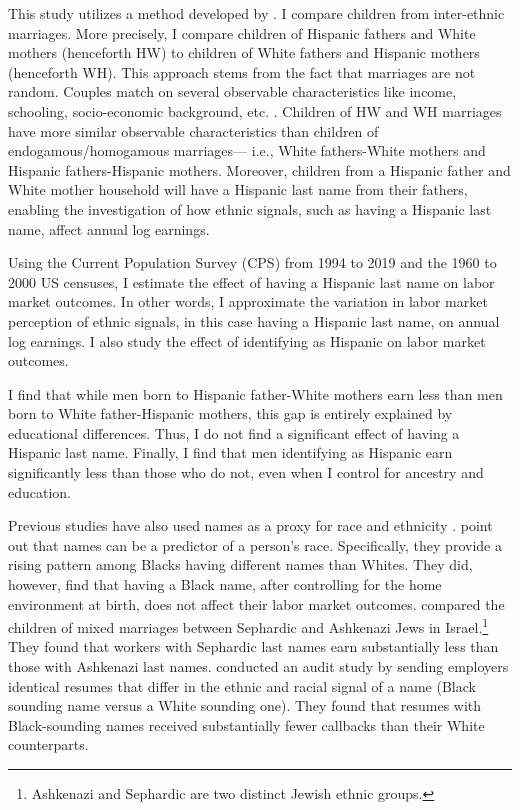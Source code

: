 \documentclass[a4paper,fleqn]{cas-sc}
\begin{document}
This study utilizes a method developed by \citet{rubinstein2014pride}. I compare children from inter-ethnic marriages. More precisely, I compare children of Hispanic fathers and White mothers (henceforth HW) to children of White fathers and Hispanic mothers (henceforth  WH). This approach stems from the fact that marriages are not random. Couples match on several observable characteristics like income, schooling, socio-economic background, etc. \citep{averettBetterWorseRelationship2008, averettEconomicRealityBeauty1996, beckerTheoryMarriagePart1973, beckerTheoryMarriagePart1974, beckerTreatiseFamily1993, browningCollectiveUnitaryModels2006, chiapporiFatterAttractionAnthropometric2012}. Children of HW and WH marriages have more similar observable characteristics than children of endogamous/homogamous marriages--- i.e., White fathers-White mothers and Hispanic fathers-Hispanic mothers. Moreover, children from a Hispanic father and White mother household will have a Hispanic last name from their fathers, enabling the investigation of how ethnic signals, such as having a Hispanic last name, affect annual log earnings.

Using the Current Population Survey (CPS) from 1994 to 2019 and the 1960 to 2000 US censuses, I estimate the effect of having a Hispanic last name on labor market outcomes. In other words, I approximate the variation in labor market perception of ethnic signals, in this case having a Hispanic last name, on annual log earnings. I also study the effect of identifying as Hispanic on labor market outcomes.

I find that while men born to Hispanic father-White mothers earn less than men born to White father-Hispanic mothers, this gap is entirely explained by educational differences. Thus, I do not find a significant effect of having a Hispanic last name. Finally, I find that men identifying as Hispanic earn significantly less than those who do not, even when I control for ancestry and education.


Previous studies have also used names as a proxy for race and ethnicity \citep{fryer2004causes, rubinstein2014pride, bertrand2004emily}. \citet{fryer2004causes} point out that names can be a predictor of a person's race. Specifically, they provide a rising pattern among Blacks having different names than Whites. They did, however, find that having a Black name, after controlling for the home environment at birth, does not affect their labor market outcomes. \citet{rubinstein2014pride} compared the children of mixed marriages between Sephardic and Ashkenazi Jews in Israel.\footnote{Ashkenazi and Sephardic are two distinct Jewish ethnic groups.} They found that workers with Sephardic last names earn substantially less than those with Ashkenazi last names. \citet{bertrand2004emily} conducted an audit study by sending employers identical resumes that differ in the ethnic and racial signal of a name (Black sounding name versus a White sounding one). They found that resumes with Black-sounding names received substantially fewer callbacks than their White counterparts.
\end{document}
